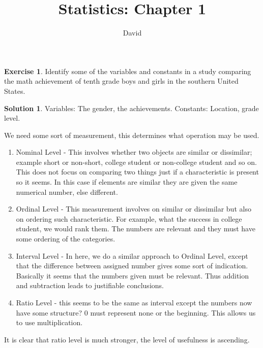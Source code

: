 \documentclass[10pt]{amsart}
\title{Statistics: Chapter 1}
\author{David}
\theoremstyle{definition}
\newtheorem{exer}[equation]{Exercise}
\newtheorem{sol*}{Solution}
\numberwithin{equation}{section}
\begin{document}
\maketitle
{}

\begin{exer}
    Identify some of the variables and constants in a study comparing the math achievement of tenth grade boys and girls in the southern United States.
\end{exer}
\begin{sol*}
    Variables: The gender, the achievements. Constants: Location, grade level.
\end{sol*}
We need some sort of measurement, this determines what operation may be used.
\begin{enumerate}
    \item Nominal Level - This involves whether two objects are similar or dissimilar; example short or non-short, college student or non-college student and so on. This does not focus on comparing two things just if a characteristic is present so it seems. In this case if elements are similar they are given the same numerical number, else different.
    \item Ordinal Level - This measurement involves on similar or dissimilar but also on ordering such characteristic. For example, what the success in college student, we would rank them. The numbers are relevant and they must have some  ordering of the categories.
    \item  Interval Level - In here, we do a similar approach to Ordinal Level, except that the difference between assigned number gives some sort of indication. Basically it seems that the numbers given must be relevant. Thus addition and subtraction leads to justifiable conclusions.
    \item Ratio Level - this seems to be the same as interval except the numbers now have some structure? 0 must represent none or the beginning. This allows us to use multiplication.
\end{enumerate}
It is clear that ratio level is much stronger, the level of usefulness is ascending.
\end{document}
